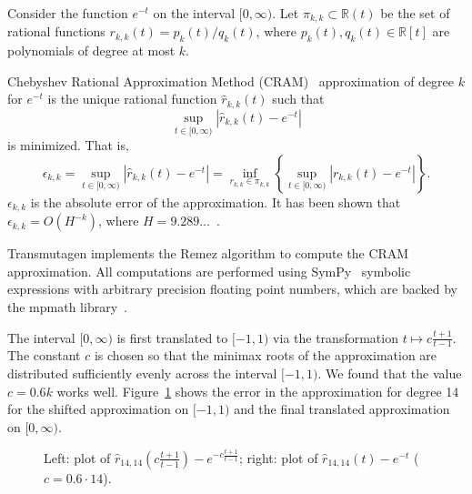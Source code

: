 Consider the function $e^{-t}$ on the interval $[0,\infty)$. Let
$\pi_{k,k}\subset \mathbb{R}(t)$ be the set of rational functions $r_{k,k}(t)
= p_k(t)/q_k(t)$, where $p_k(t), q_k(t)\in \mathbb{R}[t]$ are polynomials of
degree at most $k$.

Chebyshev Rational Approximation Method (CRAM)~\cite{ationneeded} approximation of degree $k$
for $e^{-t}$ is the unique rational function $\hat{r}_{k,k}(t)$ such that
\begin{equation}
  \sup_{t\in[0, \infty)}|\hat{r}_{k, k}(t) - e^{-t}|
\end{equation}
is minimized. That is,
\begin{equation}
  \epsilon_{k,k} = \sup_{t\in[0, \infty)}|\hat{r}_{k, k}(t) - e^{-t}| = \inf_{r_{k,k}\in\pi_{k,k}}\left\{\sup_{t\in[0, \infty)}|r_{k, k}(t) - e^{-t}|\right\}.
\end{equation}
$\epsilon_{k,k}$ is the absolute error of the approximation. It has been shown
that $\epsilon_{k,k} = O(H^{-k})$, where $H=9.289\ldots$~\cite{ationneeded}.

Transmutagen implements the Remez algorithm to compute the CRAM approximation.
All computations are performed using SymPy~\cite{10.7717/peerj-cs.103}
symbolic expressions with arbitrary precision floating point numbers, which
are backed by the mpmath library~\cite{ationneeded}.

The interval $[0, \infty)$ is first translated to $[-1, 1)$ via the
transformation $t\mapsto c\frac{t+1}{t-1}$. 
 The constant $c$
is chosen so that the minimax roots of the approximation are distributed
sufficiently evenly across the interval $[-1, 1)$. We found that the value
$c=0.6k$ works well. Figure~\ref{fig:cram-plot} shows the error in the
approximation for degree 14 for the shifted approximation on $[-1, 1)$ and the
final translated approximation on $[0, \infty)$.

\begin{figure}[!ht]
\centering
\resizebox{\textwidth}{!}{}
\caption{Left: plot of $\hat{r}_{14, 14}\left(c\frac{t+1}{t-1}\right) -
  e^{-c\frac{t+1}{t-1}}$; right: plot of $\hat{r}_{14, 14}(t) -
e^{-t}$ ($c=0.6\cdot14$).}
\label{fig:cram-plot}
\end{figure}


